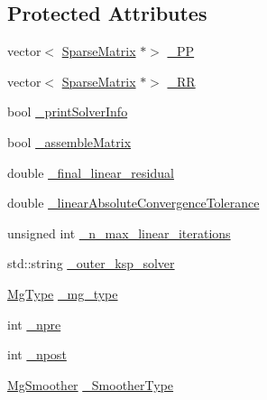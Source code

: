 \subsection*{Protected Attributes}
\begin{DoxyCompactItemize}
\item 
vector$<$ \mbox{\hyperlink{classfemus_1_1_sparse_matrix}{Sparse\+Matrix}} $\ast$$>$ \mbox{\hyperlink{classfemus_1_1_linear_implicit_system_a6ea4defedb00299a9c06d82698a0c073}{\+\_\+\+PP}}
\item 
vector$<$ \mbox{\hyperlink{classfemus_1_1_sparse_matrix}{Sparse\+Matrix}} $\ast$$>$ \mbox{\hyperlink{classfemus_1_1_linear_implicit_system_a2944654d667b56a914acf328649fc059}{\+\_\+\+RR}}
\item 
bool \mbox{\hyperlink{classfemus_1_1_linear_implicit_system_a9e561098c3684efbede7f966a39445a6}{\+\_\+print\+Solver\+Info}}
\item 
bool \mbox{\hyperlink{classfemus_1_1_linear_implicit_system_a23a8001bc251da0ab8d547fbb6c818e9}{\+\_\+assemble\+Matrix}}
\item 
double \mbox{\hyperlink{classfemus_1_1_linear_implicit_system_a9c14e68ce75435030cb2dffbcf5bb46d}{\+\_\+final\+\_\+linear\+\_\+residual}}
\item 
double \mbox{\hyperlink{classfemus_1_1_linear_implicit_system_a8f521f3e3de57b67fab030cdfb07fd6c}{\+\_\+linear\+Absolute\+Convergence\+Tolerance}}
\item 
unsigned int \mbox{\hyperlink{classfemus_1_1_linear_implicit_system_a5ce20de730578431469c9ef7317a102c}{\+\_\+n\+\_\+max\+\_\+linear\+\_\+iterations}}
\item 
std\+::string \mbox{\hyperlink{classfemus_1_1_linear_implicit_system_a81465c8fb2710d7669104f03e9e22dd3}{\+\_\+outer\+\_\+ksp\+\_\+solver}}
\item 
\mbox{\hyperlink{_mg_type_enum_8hpp_a35aafc39068a269f658aac64338aa781}{Mg\+Type}} \mbox{\hyperlink{classfemus_1_1_linear_implicit_system_a927cbce3430ab2ffe4ae7f6d3b0aba8d}{\+\_\+mg\+\_\+type}}
\item 
int \mbox{\hyperlink{classfemus_1_1_linear_implicit_system_abe867a15e13654f6e52242b55b617cbb}{\+\_\+npre}}
\item 
int \mbox{\hyperlink{classfemus_1_1_linear_implicit_system_ace7de7793929bc767ccea487df0ef9d5}{\+\_\+npost}}
\item 
\mbox{\hyperlink{_mg_smoother_enum_8hpp_a4d11c2ff93e2f0f440c879a9c40cda71}{Mg\+Smoother}} \mbox{\hyperlink{classfemus_1_1_linear_implicit_system_a6fa03af37a6a0aed8882f853f7a8ebf5}{\+\_\+\+Smoother\+Type}}

\end{DoxyCompactItemize}
